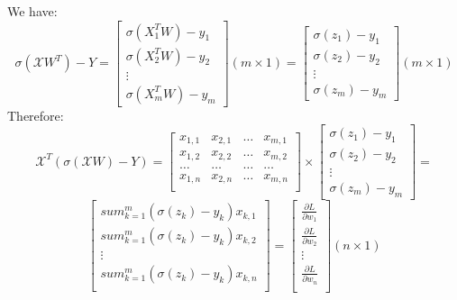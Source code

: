 \documentclass{article}
\begin{document}
    We have:
    \[
        \sigma\left(\mathcal{X}W^{T} \right) - Y = 
        \begin{bmatrix}
            \sigma\left(X_1^{T}W\right) - y_1 \\
            \sigma\left(X_2^{T}W\right) - y_2 \\
            \vdots  \\
            \sigma\left(X_m^{T}W\right) - y_m
        \end{bmatrix} (m \times 1) = 
        \begin{bmatrix}
            \sigma\left(z_1\right) - y_1 \\
            \sigma\left(z_2\right) - y_2 \\
            \vdots  \\
            \sigma\left(z_m\right) - y_m
        \end{bmatrix} (m \times 1)
    \]
    Therefore:
    \[
        \mathcal{X}^{T}\left(\sigma\left(\mathcal{X}W\right) - Y \right) = 
        \begin{bmatrix}
            x_{1, 1} & x_{2, 1} & \hdots & x_{m, 1} \\
            x_{1, 2} & x_{2, 2} & \hdots & x_{m, 2} \\
            \hdots & \hdots & \hdots & \hdots \\
            x_{1, n} & x_{2, n} & \hdots & x_{m, n} \\
        \end{bmatrix} \times
        \begin{bmatrix}
            \sigma\left(z_1\right) - y_1 \\
            \sigma\left(z_2\right) - y_2 \\
            \vdots  \\
            \sigma\left(z_m\right) - y_m
        \end{bmatrix} = 
    \]
    \[
        \begin{bmatrix}
            sum_{k=1}^{m}\left(\sigma(z_k) - y_k\right)x_{k,1} \\
            sum_{k=1}^{m}\left(\sigma(z_k) - y_k\right)x_{k,2} \\ 
            \vdots  \\
            sum_{k=1}^{m}\left(\sigma(z_k) - y_k\right)x_{k,n} \\ 
        \end{bmatrix} = 
        \begin{bmatrix}
            \frac{\partial L}{\partial w_1} \\
            \frac{\partial L}{\partial w_2} \\ 
            \vdots  \\
            \frac{\partial L}{\partial w_n} \\ 
        \end{bmatrix} (n \times 1)
    \]
\end{document}
